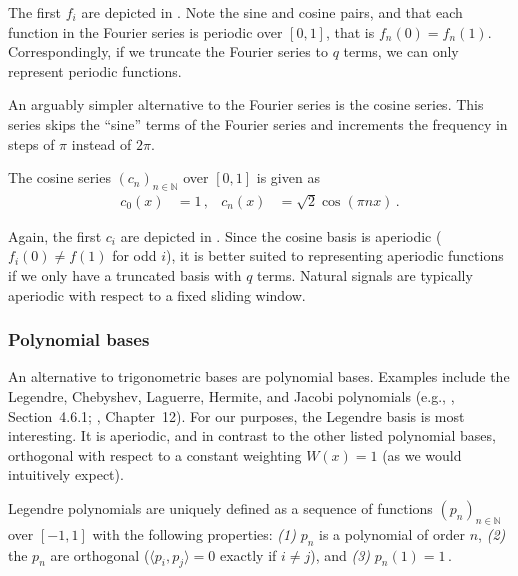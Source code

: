 \noindent The first $f_i$ are depicted in .
Note the sine and cosine pairs, and that each function in the Fourier series is periodic over $[0, 1]$, that is $f_n(0) = f_n(1)$.
Correspondingly, if we truncate the Fourier series to $q$ terms, we can only represent periodic functions.

An arguably simpler alternative to the Fourier series is the cosine series.
This series skips the \enquote{sine} terms of the Fourier series and increments the frequency in steps of $\pi$ instead of $2\pi$.

\begin{definition}
	The cosine series $(c_n)_{n \in \mathbb{N}}$ over $[0, 1]$ is given as
	\begin{align}
	 	c_0(x) &= 1 \,, &
	 	c_n(x) &= \sqrt{2}\cos(\pi n x) \,.
	 	\label{eqn:cosine_basis}
	\end{align}
\end{definition}

\noindent Again, the first $c_i$ are depicted in .
Since the cosine basis is aperiodic ($f_i(0) \neq f(1)$ for odd $i$), it is better suited to representing aperiodic functions if we only have a truncated basis with $q$ terms.
Natural signals are typically aperiodic with respect to a fixed sliding window.

\subsubsection{Polynomial bases}

An alternative to trigonometric bases are polynomial bases.
Examples include the Legendre, Chebyshev, Laguerre, Hermite, and Jacobi polynomials (e.g., \cite{press2007numerical}, Section~4.6.1; \cite{arfken2005mathematical}, Chapter~12).
For our purposes, the Legendre basis is most interesting.
It is aperiodic, and in contrast to the other listed polynomial bases, orthogonal with respect to a constant weighting $W(x) = 1$ (as we would intuitively expect).

\begin{definition}
\label{def:legendre_polynomial}
Legendre polynomials are uniquely defined as a sequence of functions $(p_n)_{n \in \mathbb{N}}$ over $[-1, 1]$ with the following properties: \emph{(1)} $p_n$ is a polynomial of order $n$, \emph{(2)} the $p_n$ are orthogonal ($\langle p_i, p_j \rangle = 0$ exactly if $i \neq j$), and \emph{(3)} $p_n(1) = 1\,$.
\end{definition}

